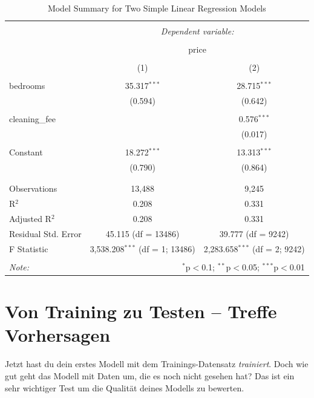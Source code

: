 \documentclass[
]{book}
\begin{document}
\begin{table}[!htbp] \centering 
  \caption{Model Summary for Two Simple Linear Regression Models} 
  \label{} 
\begin{tabular}{@{\extracolsep{5pt}}lcc} 
\\[-1.8ex]\hline 
\hline \\[-1.8ex] 
 & \multicolumn{2}{c}{\textit{Dependent variable:}} \\ 
\cline{2-3} 
\\[-1.8ex] & \multicolumn{2}{c}{price} \\ 
\\[-1.8ex] & (1) & (2)\\ 
\hline \\[-1.8ex] 
 bedrooms & 35.317$^{***}$ & 28.715$^{***}$ \\ 
  & (0.594) & (0.642) \\ 
  & & \\ 
 cleaning\_fee &  & 0.576$^{***}$ \\ 
  &  & (0.017) \\ 
  & & \\ 
 Constant & 18.272$^{***}$ & 13.313$^{***}$ \\ 
  & (0.790) & (0.864) \\ 
  & & \\ 
\hline \\[-1.8ex] 
Observations & 13,488 & 9,245 \\ 
R$^{2}$ & 0.208 & 0.331 \\ 
Adjusted R$^{2}$ & 0.208 & 0.331 \\ 
Residual Std. Error & 45.115 (df = 13486) & 39.777 (df = 9242) \\ 
F Statistic & 3,538.208$^{***}$ (df = 1; 13486) & 2,283.658$^{***}$ (df = 2; 9242) \\ 
\hline 
\hline \\[-1.8ex] 
\textit{Note:}  & \multicolumn{2}{r}{$^{*}$p$<$0.1; $^{**}$p$<$0.05; $^{***}$p$<$0.01} \\ 
\end{tabular} 
\end{table}

\hypertarget{von-training-zu-testen-treffe-vorhersagen}{%
\section{Von Training zu Testen -- Treffe Vorhersagen}\label{von-training-zu-testen-treffe-vorhersagen}}

Jetzt hast du dein erstes Modell mit dem Trainings-Datensatz \emph{trainiert}.
Doch wie gut geht das Modell mit Daten um, die es noch nicht gesehen hat?
Das ist ein sehr wichtiger Test um die Qualität deines Modells zu bewerten.
\end{document}
